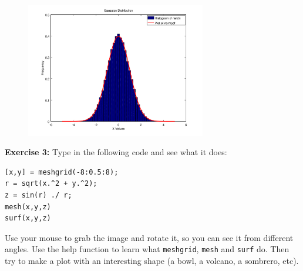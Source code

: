 \documentclass[12pt,a4paper]{article}   %
\begin{document}
\begin{figure}[h!]
  \centering
  \includegraphics[width=0.7\textwidth]{img/gaussian.png}
\end{figure}




% 
% 
% 

\textbf{Exercise 3:} Type in the following code and see what it does:

\begin{verbatim}
[x,y] = meshgrid(-8:0.5:8);
r = sqrt(x.^2 + y.^2);
z = sin(r) ./ r;
mesh(x,y,z)
surf(x,y,z)
\end{verbatim}

Use your mouse to grab the image and rotate it, so you can see it from different angles.
Use the help function to learn what \texttt{meshgrid}, \texttt{mesh} and \texttt{surf} do.
Then try to make a plot with an interesting shape (a bowl, a volcano, a sombrero, etc).

\pagebreak
\end{document}
